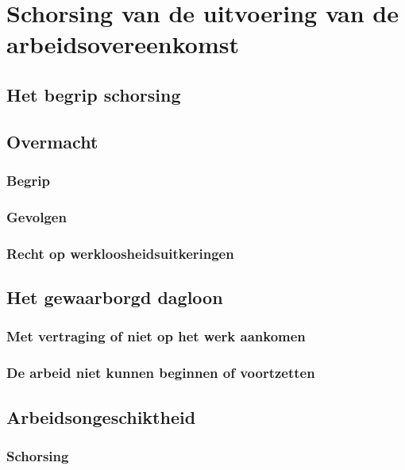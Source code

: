 \chapter{Schorsing van de uitvoering van de arbeidsovereenkomst}
\label{hoofdstuk:2}

\section{Het begrip schorsing}

\section{Overmacht}

\subsection{Begrip}

\subsection{Gevolgen}

\subsection{Recht op werkloosheidsuitkeringen}

\section{Het gewaarborgd dagloon}

\subsection{Met vertraging of niet op het werk aankomen}

\subsection{De arbeid niet kunnen beginnen of voortzetten}

\section{Arbeidsongeschiktheid}

\subsection{Schorsing}

